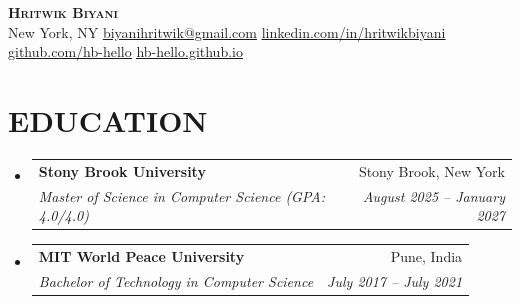 \documentclass[letterpaper,11pt]{article}
\makeatletter
\newcommand{\resumeSubheading}[4]{
  \vspace{-2pt}\item
    \begin{tabular*}{0.97\textwidth}[t]{l@{\extracolsep{\fill}}r}
      \textbf{#1} & #2 \\
      \textit{\small#3} & \textit{\small #4} \\
    \end{tabular*}\vspace{-7pt}
}
\newcommand{\resumeSubHeadingListStart}{\begin{itemize}[leftmargin=0.15in, label={}]}
\newcommand{\resumeSubHeadingListEnd}{\end{itemize}}
\newenvironment{entries}{\resumeSubHeadingListStart}{\resumeSubHeadingListEnd}
\newcommand{\education}[5][]{\resumeSubheading{#2}{#3}{#4}{#5}}
\newcommand{\resumeLink}[3][]{\href{#2}{#1\color{linkblue}%
  \setlength{\ULdepth}{1.2pt}\renewcommand{\ULthickness}{0.4pt}\uline{#3}}}
\makeatother
\begin{document}
\begin{center}
    \textbf{\Huge \scshape Hritwik Biyani} \\ \vspace{1pt}
    \small New York, NY \textbar{} \resumeLink{mailto:biyanihritwik@gmail.com}{biyanihritwik@gmail.com} \textbar{} 
    \resumeLink{https://linkedin.com/in/hritwikbiyani}{linkedin.com/in/hritwikbiyani} \textbar{}
    \resumeLink{https://github.com/hb-hello}{github.com/hb-hello} \textbar{}
    \resumeLink{https://hb-hello.github.io}{hb-hello.github.io}
\end{center}


\section{EDUCATION}
  \begin{entries}
    \education[sbu-ms]
      {Stony Brook University}{Stony Brook, New York}
      {Master of Science in Computer Science (GPA: 4.0/4.0)}{August 2025 -- January 2027}
    \education[mitwpu-btech]
      {MIT World Peace University}{Pune, India}
      {Bachelor of Technology in Computer Science}{July 2017 -- July 2021}
  \end{entries}


\end{document}
